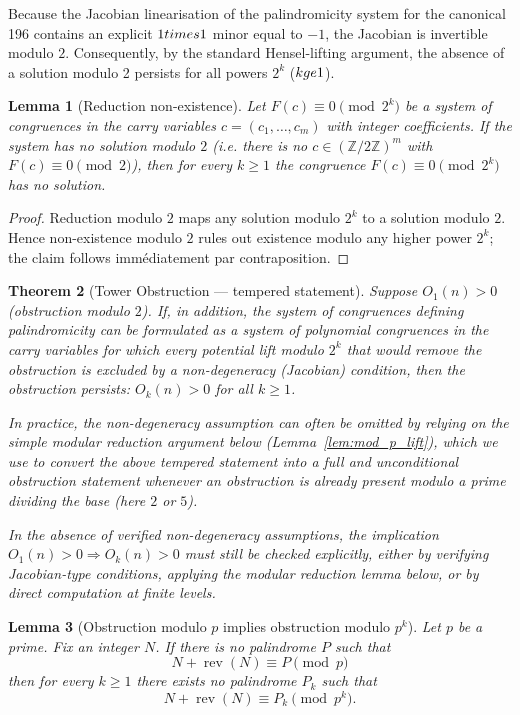 \documentclass[12pt,a4paper]{article}
\newtheorem{theorem}{Theorem}[section]
\newtheorem{lemma}[theorem]{Lemma}
\begin{document}
Because the Jacobian linearisation of the palindromicity system for the canonical 196 contains an explicit $1\\times1$ minor equal to $-1$, the Jacobian is invertible modulo $2$. Consequently, by the standard Hensel-lifting argument, the absence of a solution modulo 2 persists for all powers $2^{k}$ ($k\\ge 1$).
\begin{lemma}[Reduction non-existence]
\label{lem:reduction_nonexist-7}
Let $F(c)\equiv 0\pmod{2^k}$ be a system of congruences in the carry variables $c=(c_1,\dots,c_m)$ with integer coefficients. If the system has no solution modulo $2$ (i.e. there is no $c\in(\mathbb Z/2\mathbb Z)^m$ with $F(c)\equiv0\pmod 2$), then for every $k\ge1$ the congruence $F(c)\equiv0\pmod{2^k}$ has no solution.
\end{lemma}

\begin{proof}
Reduction modulo $2$ maps any solution modulo $2^k$ to a solution modulo $2$. Hence non-existence modulo $2$ rules out existence modulo any higher power $2^k$; the claim follows immédiatement par contraposition.
\end{proof}

\begin{theorem}[Tower Obstruction --- tempered statement]\label{thm:tower-7}
Suppose $O_1(n) > 0$ (obstruction modulo $2$). If, in addition, the system of congruences defining palindromicity can be formulated as a system of polynomial congruences in the carry variables for which every potential lift modulo $2^k$ that would remove the obstruction is excluded by a non-degeneracy (Jacobian) condition, then the obstruction persists: $O_k(n) > 0$ for all $k \ge 1$.

In practice, the non-degeneracy assumption can often be omitted by relying on the simple modular reduction argument below (Lemma~\ref{lem:mod_p_lift}), which we use to convert the above tempered statement into a full and unconditional obstruction statement whenever an obstruction is already present modulo a prime dividing the base (here $2$ or $5$).

In the absence of verified non-degeneracy assumptions, the implication $O_1(n) > 0 \Rightarrow O_k(n) > 0$ must still be checked explicitly, either by verifying Jacobian-type conditions, applying the modular reduction lemma below, or by direct computation at finite levels.
\end{theorem}

\begin{lemma}[Obstruction modulo $p$ implies obstruction modulo $p^k$]
Let $p$ be a prime. Fix an integer $N$. If there is no palindrome $P$ such that
$$N+\operatorname{rev}(N)\equiv P\pmod p$$
then for every $k\ge1$ there exists no palindrome $P_k$ such that
$$N+\operatorname{rev}(N)\equiv P_k\pmod{p^k}.$$
\end{lemma}
\end{document}
